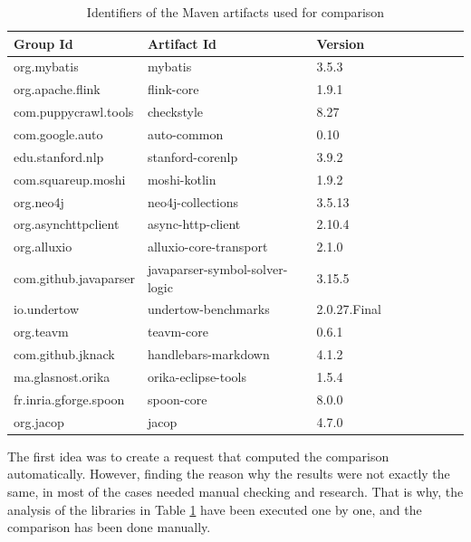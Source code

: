\begin{table}[ht]
    \begin{center}
    \begin{tabular}{|l|l|l|l|l|l|l|l|l|}
    \hline
    Group Id              & Artifact Id                     & Version       \\
    \hline
    org.mybatis           &	mybatis	                        & 3.5.3         \\
    org.apache.flink      & flink-core                      & 1.9.1         \\
    com.puppycrawl.tools  & checkstyle                      & 8.27          \\
    com.google.auto       & auto-common                     & 0.10          \\
    edu.stanford.nlp      & stanford-corenlp                & 3.9.2         \\
    com.squareup.moshi    & moshi-kotlin                    & 1.9.2         \\
    org.neo4j             & neo4j-collections               & 3.5.13        \\
    org.asynchttpclient   & async-http-client               & 2.10.4        \\
    org.alluxio           & alluxio-core-transport          & 2.1.0         \\
    com.github.javaparser & javaparser-symbol-solver-logic  & 3.15.5        \\
    io.undertow           & undertow-benchmarks             & 2.0.27.Final  \\
    org.teavm             & teavm-core                      & 0.6.1         \\
    com.github.jknack     & handlebars-markdown             & 4.1.2         \\
    ma.glasnost.orika     & orika-eclipse-tools             & 1.5.4         \\
    fr.inria.gforge.spoon & spoon-core                      & 8.0.0         \\
    org.jacop             & jacop                           & 4.7.0         \\
    \hline
    \end{tabular}
    \end{center}
    \caption{Identifiers of the Maven artifacts used for comparison}
    \label{table:comparison-artifacts}
\end{table}

The first idea was to create a request that computed the comparison automatically. However, finding the reason why the results were not exactly the same, in most of the cases needed manual checking and research. That is why, the analysis of the libraries in Table \ref{table:comparison-artifacts} have been executed one by one, and the comparison has been done manually.

